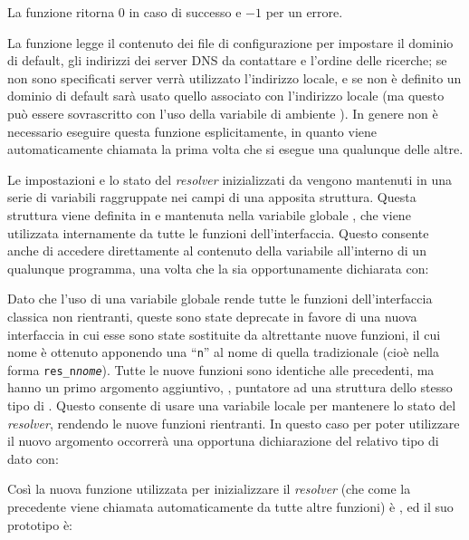 \begin{funcproto}{
}
{La funzione ritorna $0$ in caso di successo e $-1$ per un errore.
}
\end{funcproto}

La funzione legge il contenuto dei file di configurazione per impostare il
dominio di default, gli indirizzi dei server DNS da contattare e l'ordine
delle ricerche; se non sono specificati server verrà utilizzato l'indirizzo
locale, e se non è definito un dominio di default sarà usato quello associato
con l'indirizzo locale (ma questo può essere sovrascritto con l'uso della
variabile di ambiente ). In genere non è necessario
eseguire questa funzione esplicitamente, in quanto viene automaticamente
chiamata la prima volta che si esegue una qualunque delle altre.

Le impostazioni e lo stato del \textit{resolver} inizializzati da
 vengono mantenuti in una serie di variabili raggruppate nei
campi di una apposita struttura. Questa struttura viene definita in
 e mantenuta nella variabile globale , che
viene utilizzata internamente da tutte le funzioni dell'interfaccia. Questo
consente anche di accedere direttamente al contenuto della variabile
all'interno di un qualunque programma, una volta che la sia opportunamente
dichiarata con:

Dato che l'uso di una variabile globale rende tutte le funzioni
dell'interfaccia classica non rientranti, queste sono state deprecate in
favore di una nuova interfaccia in cui esse sono state sostituite da
altrettante nuove funzioni, il cui nome è ottenuto apponendo una
``\texttt{n}'' al nome di quella tradizionale (cioè nella forma
\texttt{res\_n\textsl{nome}}). Tutte le nuove funzioni sono identiche alle
precedenti, ma hanno un primo argomento aggiuntivo, , puntatore
ad una struttura dello stesso tipo di . Questo consente di usare
una variabile locale per mantenere lo stato del \textit{resolver}, rendendo le
nuove funzioni rientranti.  In questo caso per poter utilizzare il nuovo
argomento occorrerà una opportuna dichiarazione del relativo tipo di dato con:

Così la nuova funzione utilizzata per inizializzare il \textit{resolver} (che
come la precedente viene chiamata automaticamente da tutte altre funzioni) è
, ed il suo prototipo è:

